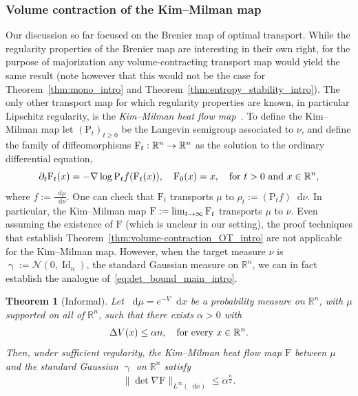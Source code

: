\documentclass[10pt]{amsart}
\newtheorem{theo}{Theorem}[section]
\theoremstyle{definition}\newtheorem{defi}[theo]{Definition}\newtheorem{rema}[theo]{Remark}\newtheorem{exam}[theo]{Example}\newtheorem{exem}[theo]{Example}\newtheorem{nota}[theo]{Notation}
\newcommand{\R}{\mathbb R}
\DeclareMathOperator{\Id}{Id}
\newcommand{\Pheat}{\mathrm{P}}
\newcommand{\KM}{\mathrm F}
\newcommand{\V}{V}
\newcommand{\dd}{n}
\newcommand{\density}{f}
\newcommand{\prob}{\rho}
\newcommand{\source}{\mu}
\newcommand{\target}{\nu}
\newcommand{\lsh}{\alpha}
\newcommand*\diff{\mathop{}\!\mathrm{d}}
\newcommand{\clN}{\mathcal{N}}
\newcommand{\Gaussian}{\upgamma}
\renewcommand*{\to}{\mathchoice{\longrightarrow}{\rightarrow}{\rightarrow}{\rightarrow}}
\let\oldin\in
\renewcommand{\in}{\mathchoice{\oldin}{\oldin}{\,\oldin\,}{\,\oldin\,}}
\begin{document}
\subsubsection{Volume contraction of the Kim--Milman map} Our discussion so far focused on the Brenier map of optimal transport. While the regularity properties of the Brenier map are interesting in their own right, for the purpose of majorization any volume-contracting transport map would yield the same result (note however that this would not be the case for Theorem~\ref{thm:mono_intro} and Theorem~\ref{thm:entropy_stability_intro}). The only other transport map for which regularity properties are known, in particular Lipschitz regularity, is the \emph{Kim--Milman heat flow map}~\cite{MR2983070}. To define the Kim--Milman map let $(\Pheat_t)_{t\ge 0}$ be the Langevin semigroup associated to $\target$, and define the family of diffeomorphisms $\KM_t:\R^{\dd}\to\R^{\dd}$ as the solution to the ordinary differential equation,
\begin{equation}\label{eq:KM_construction_intro}
\partial_t\KM_t(x)=-\nabla\log\Pheat_t\density(\KM_t(x)),\quad \KM_0(x)=x,\quad \text{for}~t>0 \text{ and } x\in\R^{\dd},
\end{equation}
where $\density:=\frac{\diff\source}{\diff\target}$. One can check that $\KM_t$ transports $\source$ to $\prob_t:=(\Pheat_t \density)\diff\target$. In particular, the Kim--Milman map $\KM:=\lim_{t\to\infty}\KM_t$ transports $\source$ to $\target$. Even assuming the existence of $\KM$ (which is unclear in our setting), the proof techniques that establish Theorem~\ref{thm:volume-contraction_OT_intro} are not applicable for the Kim--Milman map. However, when the target measure $\target$ is $\Gaussian:=\clN(0,\Id_{\dd})$, the standard Gaussian measure on $\R^{\dd}$, we can in fact establish the analogue of~\eqref{eq:det_bound_main_intro}.

\begin{theo}[Informal]\label{thm:majorization_KM_intro}
Let $\diff\source=e^{-\V}\diff x$ be a probability measure on $\R^{\dd}$, with $\source$ supported on all of $\R^{\dd}$, such that there exists $\lsh>0$ with
\[
\Delta \V(x) \le \lsh\dd, \quad\textnormal{for every $x\in\R^{\dd}$}.
\]
Then, under sufficient regularity, the Kim--Milman heat flow map $\KM$ between $\source$ and the standard Gaussian $\Gaussian$ on $\R^{\dd}$ satisfy
\begin{align}\label{eq:det_bound_KM_intro}
\|\!\det\nabla \KM\|_{L^{\infty}(\diff x)}\le \lsh^{\frac{\dd}{2}}.
\end{align}
\end{theo}
\end{document}
